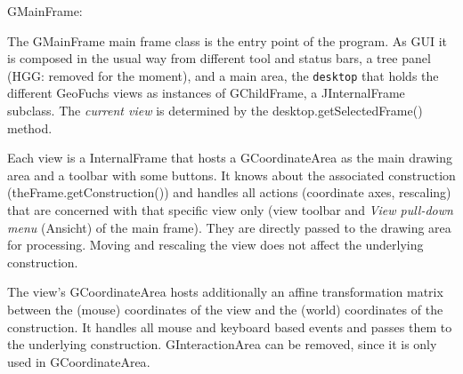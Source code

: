 \newcommand{\class}[1]{{\sf #1}}
\newcommand{\method}[1]{{\sf #1}}
\newcommand{\variable}[1]{{\sf #1}}
\newcommand{\ind}[1]{#1\index{#1}}


GMainFrame:

The \class{GMainFrame} main frame class is the entry point of the program. As
GUI it is composed in the usual way from different tool and status bars, a
tree panel (HGG: removed for the moment), and a main area, the {\tt desktop}
that holds the different GeoFuchs \ind{view}s as instances of
\class{GChildFrame}, a \class{JInternalFrame} subclass. The {\em current view}
is determined by the \method{desktop.getSelectedFrame()} method.

Each view is a \class{InternalFrame} that hosts a \class{GCoordinateArea} as
the main drawing area and a toolbar with some buttons. It knows about the
associated \ind{construction} (\method{theFrame.getConstruction()}) and
handles all actions (coordinate axes, rescaling) that are concerned with that
specific view only (view toolbar and {\em View pull-down menu} (Ansicht) of
the main frame). They are directly passed to the drawing area for processing.
Moving and rescaling the view does not affect the underlying construction.

The view's \class{GCoordinateArea} hosts additionally an affine transformation
matrix between the (mouse) coordinates of the view and the (world) coordinates
of the construction.  It handles all mouse and keyboard based events
and passes them to the underlying construction. \class{GInteractionArea} can
be removed, since it is only used in \class{GCoordinateArea}. 


